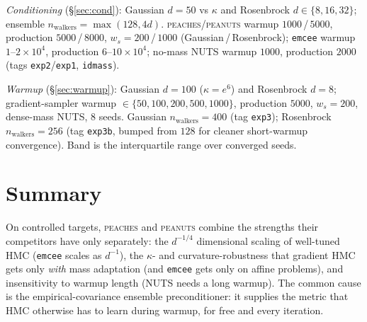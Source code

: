\documentclass[11pt]{article}
\begin{document}
\textit{Conditioning} (\S\ref{sec:cond}): Gaussian $d{=}50$ vs $\kappa$ and
Rosenbrock $d\in\{8,16,32\}$; ensemble $n_{\text{walkers}}=\max(128,4d)$.
\textsc{peaches}/\textsc{peanuts} warmup $1000$\,/\,$5000$, production
$5000$\,/\,$8000$, $w_s{=}200$\,/\,$1000$ (Gaussian\,/\,Rosenbrock); \texttt{emcee}
warmup $1$--$2\!\times\!10^4$, production $6$--$10\!\times\!10^4$; no-mass NUTS
warmup $1000$, production $2000$ (tags \texttt{exp2}/\texttt{exp1},
\texttt{idmass}).

\textit{Warmup} (\S\ref{sec:warmup}): Gaussian $d{=}100$ ($\kappa=e^6$) and
Rosenbrock $d{=}8$; gradient-sampler warmup $\in\{50,100,200,500,1000\}$,
production $5000$, $w_s{=}200$, dense-mass NUTS, $8$ seeds. Gaussian
$n_{\text{walkers}}=400$ (tag \texttt{exp3}); Rosenbrock $n_{\text{walkers}}=256$
(tag \texttt{exp3b}, bumped from $128$ for cleaner short-warmup convergence).
Band is the interquartile range over converged seeds.

\section{Summary}

On controlled targets, \textsc{peaches} and \textsc{peanuts} combine the
strengths their competitors have only separately: the $d^{-1/4}$ dimensional
scaling of well-tuned HMC (\texttt{emcee} scales as $d^{-1}$), the
$\kappa$- and curvature-robustness that gradient HMC gets only \emph{with}
mass adaptation (and \texttt{emcee} gets only on affine problems), and
insensitivity to warmup length (NUTS needs a long warmup). The common cause is
the empirical-covariance ensemble preconditioner: it supplies the metric that
HMC otherwise has to learn during warmup, for free and every iteration.
\end{document}
